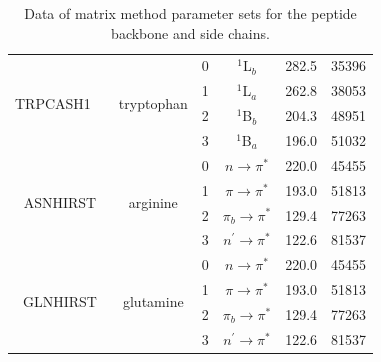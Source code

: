\documentclass[11pt, letterpaper]{article}
\begin{document}
\begin{table}
\begin{tabular}{cccccc}
\multirow{4}{*}{TRPCASH1~~\cite{Rogers:03:11191}}  & \multirow{4}{*}{tryptophan}
		&   0   &           $^1$L$_b$           &   282.5   &   35396   \\
	&	&   1   &           $^1$L$_a$           &   262.8   &   38053   \\
	&	&   2   &           $^1$B$_b$           &   204.3   &   48951   \\
	&	&   3   &           $^1$B$_a$           &   196.0   &   51032   \\ \hline
  
\multirow{4}{*}{ASNHIRST} & \multirow{4}{*}{arginine}
		&   0   &   $n\rightarrow\pi^*$         &    220.0  &   45455   \\
	&	&   1   &   $\pi\rightarrow\pi^*$       &    193.0  &   51813   \\
	&	&   2   &   $\pi_{b}\rightarrow\pi^*$   &    129.4  &   77263   \\
	&	&   3   &   $n^\prime\rightarrow\pi^*$  &    122.6  &   81537   \\ \hline
  
\multirow{4}{*}{GLNHIRST} & \multirow{4}{*}{glutamine}
		&   0   &   $n\rightarrow\pi^*$         &    220.0  &   45455   \\
	&	&   1   &   $\pi\rightarrow\pi^*$       &    193.0  &   51813   \\
	&	&   2   &   $\pi_{b}\rightarrow\pi^*$   &    129.4  &   77263   \\
	&	&   3   &   $n^\prime\rightarrow\pi^*$  &    122.6  &   81537   \\
\bottomrule
\end{tabular}
\caption{Data of matrix method parameter sets for the peptide backbone and side chains.}
\label{Tab:ParameterSets}
\end{table}
\end{document}
